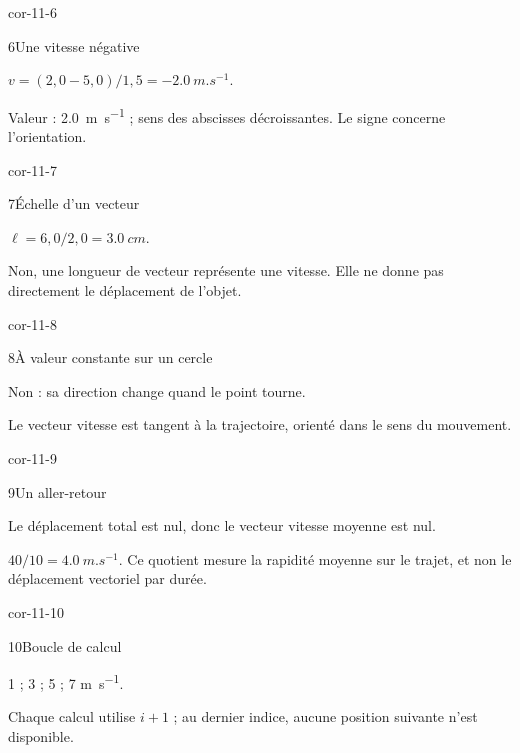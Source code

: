 \begin{blocLivre}{cor-11-6}\begin{corrige}{6}{Une vitesse négative}
\begin{questions}
\item $v=(2,0-5,0)/1,5=\qty{-2,0}{m.s^{-1}}$.
\item Valeur : \qty{2,0}{m.s^{-1}} ; sens des abscisses décroissantes. Le signe concerne l’orientation.
\end{questions}
\end{corrige}\end{blocLivre}
\begin{blocLivre}{cor-11-7}\begin{corrige}{7}{Échelle d’un vecteur}
\begin{questions}
\item $\ell=6,0/2,0=\qty{3,0}{cm}$.
\item Non, une longueur de vecteur représente une vitesse. Elle ne donne pas directement le déplacement de l’objet.
\end{questions}
\end{corrige}\end{blocLivre}
\begin{blocLivre}{cor-11-8}\begin{corrige}{8}{À valeur constante sur un cercle}
\begin{questions}
\item Non : sa direction change quand le point tourne.
\item Le vecteur vitesse est tangent à la trajectoire, orienté dans le sens du mouvement.
\end{questions}
\end{corrige}\end{blocLivre}
\begin{blocLivre}{cor-11-9}\begin{corrige}{9}{Un aller-retour}
\begin{questions}
\item Le déplacement total est nul, donc le vecteur vitesse moyenne est nul.
\item $40/10=\qty{4,0}{m.s^{-1}}$. Ce quotient mesure la rapidité moyenne sur le trajet, et non le déplacement vectoriel par durée.
\end{questions}
\end{corrige}\end{blocLivre}
\begin{blocLivre}{cor-11-10}\begin{corrige}{10}{Boucle de calcul}
\begin{questions}
\item 1 ; 3 ; 5 ; 7 \unit{m.s^{-1}}.
\item Chaque calcul utilise $i+1$ ; au dernier indice, aucune position suivante n’est disponible.
\end{questions}
\end{corrige}\end{blocLivre}
